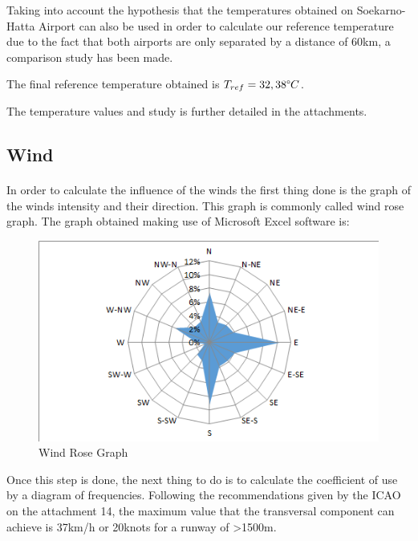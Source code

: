 		Taking into account the hypothesis that the temperatures obtained on Soekarno-Hatta Airport can also be used in order to calculate our reference temperature due to the fact that both airports are only separated by a distance of 60km, a comparison study has been made. 
		
		The final reference temperature obtained is \(T_{ref}= 32,38\degree C\). 
		
		The temperature values and study is further detailed in the attachments.
		
		\subsection{Wind}
		\paragraph{}In order to calculate the influence of the winds the first thing done is the graph of the winds intensity and their direction. This graph is commonly called wind rose graph. The graph obtained making use of Microsoft Excel software is:
		
		\begin{figure}[H]
			\centering
			\includegraphics[clip, trim=0.03cm 0cm 0cm 0.03cm, width=1\textwidth]{./images/WIND/ROSE}
			\caption{Wind Rose Graph} %
			\label{} %
		\end{figure}
		
		Once this step is done, the next thing to do is to calculate the coefficient of use by a diagram of frequencies. Following the recommendations given by the ICAO on the attachment 14, the maximum value that the transversal component can achieve is 37km/h or 20knots for a runway of >1500m.
		
